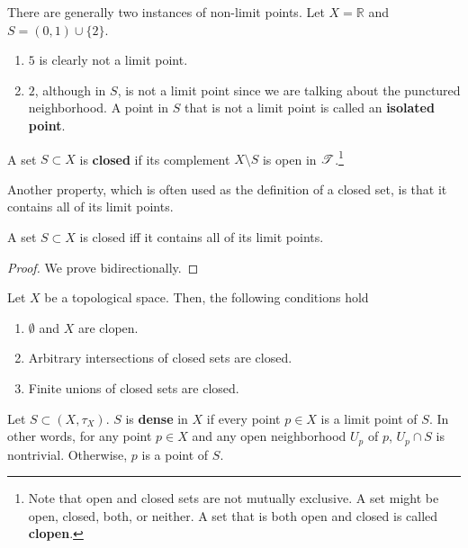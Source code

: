   \begin{example}
    There are generally two instances of non-limit points. Let $X = \mathbb{R}$ and $S = (0, 1) \cup \{2\}$. 
    \begin{enumerate}
      \item $5$ is clearly not a limit point. 
      \item $2$, although in $S$, is not a limit point since we are talking about the punctured neighborhood. A point in $S$ that is not a limit point is called an \textbf{isolated point}. 
    \end{enumerate}
  \end{example}

  \begin{definition}
    A set $S \subset X$ is \textbf{closed} if its complement $X \setminus S$ is open in $\operatorname{\mathscr{T}}$.\footnote{Note that open and closed sets are not mutually exclusive. A set might be open, closed, both, or neither. A set that is both open and closed is called \textbf{clopen}.}
  \end{definition}
  
  Another property, which is often used as the definition of a closed set, is that it contains all of its limit points. 

  \begin{lemma}
    A set $S \subset X$ is closed iff it contains all of its limit points. 
  \end{lemma}
  \begin{proof}
    We prove bidirectionally. 
  \end{proof}

  \begin{theorem}
    Let $X$ be a topological space. Then, the following conditions hold
    \begin{enumerate}
      \item $\emptyset$ and $X$ are clopen.
      \item Arbitrary intersections of closed sets are closed. 
      \item Finite unions of closed sets are closed. 
    \end{enumerate}
  \end{theorem}

  \begin{definition}
    Let $S \subset (X, \tau_X)$. $S$ is \textbf{dense} in $X$ if every point $p \in X$ is a limit point of $S$. In other words, for any point $p \in X$ and any open neighborhood $U_p$ of $p$, $U_p \cap S$ is nontrivial. Otherwise, $p$ is a point of $S$. 
  \end{definition}

